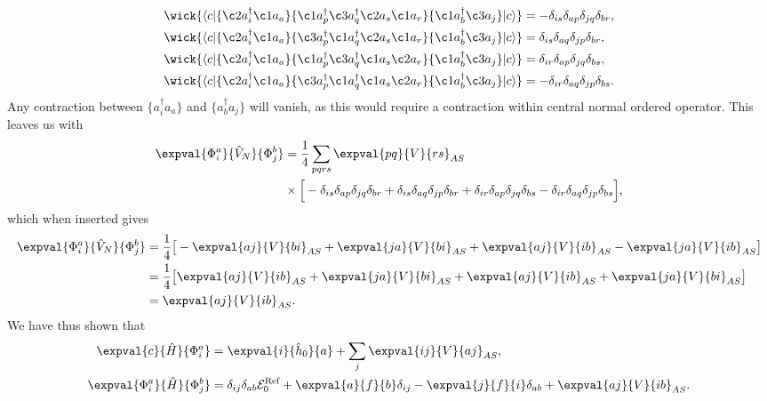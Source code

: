 \begin{align*}
    \wick{
        \langle c \vert
        \{ \c2 a_i^\dagger \c1 a_a \}
        \{ \c1 a_p^\dagger \c3 a_q^\dagger \c2 a_s \c1 a_r \}
        \{ \c1 a_b^\dagger \c3 a_j \}
        \vert c \rangle
    }
    &= -\delta_{is} \delta_{ap} \delta_{jq} \delta_{br}, \\
    \wick{
        \langle c \vert
        \{ \c2 a_i^\dagger \c1 a_a \}
        \{ \c3 a_p^\dagger \c1 a_q^\dagger \c2 a_s \c1 a_r \}
        \{ \c1 a_b^\dagger \c3 a_j \}
        \vert c \rangle
    } &= \delta_{is} \delta_{aq} \delta_{jp} \delta_{br}, \\
    \wick{
        \langle c \vert
        \{ \c2 a_i^\dagger \c1 a_a \}
        \{ \c1 a_p^\dagger \c3 a_q^\dagger \c1 a_s \c2 a_r \}
        \{ \c1 a_b^\dagger \c3 a_j \}
        \vert c \rangle
    } &= \delta_{ir} \delta_{ap} \delta_{jq} \delta_{bs}, \\
    \wick{
        \langle c \vert
        \{ \c2 a_i^\dagger \c1 a_a \}
        \{ \c3 a_p^\dagger \c1 a_q^\dagger \c1 a_s \c2 a_r \}
        \{ \c1 a_b^\dagger \c3 a_j \}
        \vert c \rangle
    } &= -\delta_{ir} \delta_{aq} \delta_{jp} \delta_{bs}.
\end{align*}
Any contraction between $\{a_i^\dagger a_a\}$ and $\{a_b^\dagger a_j\}$ will vanish, as this would require a contraction within central normal ordered operator.
This leaves us with
\begin{align*}
    \expval{\Phi_i^a}{\hat{V}_N}{\Phi_{j}^{b}}
    &= \frac{1}{4} \sum_{pqrs} \expval{pq}{V}{rs}_{AS} \\
    &\times \Big[
        - \delta_{is} \delta_{ap} \delta_{jq} \delta_{br}
        + \delta_{is} \delta_{aq} \delta_{jp} \delta_{br}
        + \delta_{ir} \delta_{ap} \delta_{jq} \delta_{bs}
        - \delta_{ir} \delta_{aq} \delta_{jp} \delta_{bs}
    \Big],
\end{align*}
which when inserted gives
\begin{align*}
    \expval{\Phi_i^a}{\hat{V}_N}{\Phi_{j}^{b}} &= \frac{1}{4} \big[
        -\expval{aj}{V}{bi}_{AS} + \expval{ja}{V}{bi}_{AS} + \expval{aj}{V}{ib}_{AS} - \expval{ja}{V}{ib}_{AS}
    \big] \\
    &= \frac{1}{4} \big[
        \expval{aj}{V}{ib}_{AS} + \expval{ja}{V}{bi}_{AS} + \expval{aj}{V}{ib}_{AS} + \expval{ja}{V}{bi}_{AS}
    \big] \\
    &= \expval{aj}{V}{ib}_{AS}.
\end{align*}
We have thus shown that
\begin{equation}
    \begin{split}
        \expval{c}{\hat{H}}{\Phi_i^a} &= \expval{i}{\hat{h}_0}{a} + \sum_{j} \expval{ij}{V}{aj}_{AS}, \\
        \expval{\Phi_i^a}{\hat{H}}{\Phi_{j}^{b}} &= \delta_{ij} \delta_{ab} \mathcal{E}_0^{\text{Ref}} + \expval{a}{f}{b} \delta_{ij} - \expval{j}{f}{i} \delta_{ab} + \expval{aj}{V}{ib}_{AS}.
    \end{split}
\end{equation}
